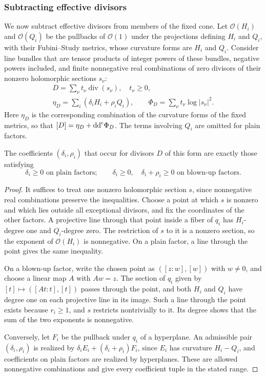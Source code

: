 \subsubsection{Subtracting effective divisors}
We now subtract effective divisors from members of the fixed cone. Let $\mathcal O(H_i)$ and $\mathcal O(Q_i)$ be the pullbacks of $\mathcal O(1)$ under the projections defining $H_i$ and $Q_i$, with their Fubini--Study metrics, whose curvature forms are $H_i$ and $Q_i$. Consider line bundles that are tensor products of integer powers of these bundles, negative powers included, and finite nonnegative real combinations of zero divisors of their nonzero holomorphic sections $s_\nu$:
\[
 \begin{gathered}
 D=\sum_\nu t_\nu\operatorname{div}(s_\nu),\quad t_\nu\geq0,\\
 \eta_D=\sum_i(\delta_iH_i+\rho_iQ_i),\qquad
 \Phi_D=\sum_\nu t_\nu\log|s_\nu|^2.
 \end{gathered}
\]
Here $\eta_D$ is the corresponding combination of the curvature forms of the fixed metrics, so that $[D]=\eta_D+\mathrm{dd}^{\mathrm{c}}\Phi_D$. The terms involving $Q_i$ are omitted for plain factors.

\begin{lemma}\label{lem:nef-projective-effective-divisor-range}
The coefficients $(\delta_i,\rho_i)$ that occur for divisors $D$ of this form are exactly those satisfying
\[
 \delta_i\geq0\text{ on plain factors};\qquad
 \delta_i\geq0,\quad\delta_i+\rho_i\geq0
                         \text{ on blown-up factors}.
\]
\end{lemma}
\begin{proof}
It suffices to treat one nonzero holomorphic section $s$, since nonnegative real combinations preserve the inequalities. Choose a point at which $s$ is nonzero and which lies outside all exceptional divisors, and fix the coordinates of the other factors. A projective line through that point inside a fiber of $q_i$ has $H_i$-degree one and $Q_i$-degree zero. The restriction of $s$ to it is a nonzero section, so the exponent of $\mathcal O(H_i)$ is nonnegative. On a plain factor, a line through the point gives the same inequality.

On a blown-up factor, write the chosen point as $([z:w],[w])$ with $w\ne0$, and choose a linear map $A$ with $Aw=z$. The section of $q_i$ given by $[t]\mapsto([At:t],[t])$ passes through the point, and both $H_i$ and $Q_i$ have degree one on each projective line in its image. Such a line through the point exists because $r_i\geq1$, and $s$ restricts nontrivially to it. Its degree shows that the sum of the two exponents is nonnegative.

Conversely, let $F_i$ be the pullback under $q_i$ of a hyperplane. An admissible pair $(\delta_i,\rho_i)$ is realized by $\delta_iE_i+(\delta_i+\rho_i)F_i$, since $E_i$ has curvature $H_i-Q_i$, and coefficients on plain factors are realized by hyperplanes. These are allowed nonnegative combinations and give every coefficient tuple in the stated range.
\end{proof}

